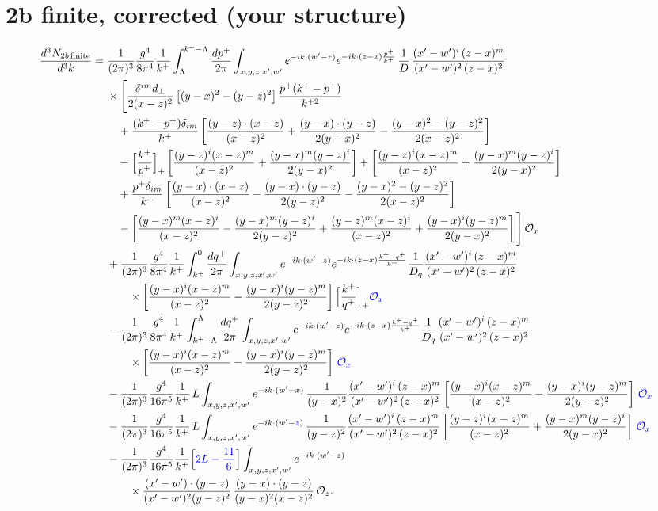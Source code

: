 \documentclass[10pt]{article}
\numberwithin{equation}{section}
\newcommand{\new}[1]{{\color{blue}#1}}
\newcommand{\pre}{\frac{1}{(2\pi)^{3}}\frac{g^{4}}{8\pi^{4}}\frac{1}{k^{+}}}
\newcommand{\preE}{\frac{1}{(2\pi)^{3}}\frac{g^{4}}{16\pi^{5}}\frac{1}{k^{+}}}
\newcommand{\Kxw}{\frac{(x'-w')^{i}\,(z-x)^{m}}{(x'-w')^{2}\,(z-x)^{2}}}
\newcommand{\BB}{\left[\frac{(y-x)^{i}(x-z)^{m}}{(x-z)^{2}}-\frac{(y-x)^{i}(y-z)^{m}}{2(y-z)^{2}}\right]}
\newcommand{\BF}{\left[\frac{(y-z)^{i}(x-z)^{m}}{(x-z)^{2}}+\frac{(y-x)^{m}(y-z)^{i}}{2(y-x)^{2}}\right]}
\newcommand{\Ox}{\mathcal O_x}
\newcommand{\Oz}{\mathcal O_z}
\begin{document}
\section{2b finite, corrected (your structure)}
\begin{align}
\frac{d^{3}N_{2b\,\rm finite}}{d^{3}k}={}&\pre\int_{\Lambda}^{k^{+}-\Lambda}\frac{dp^{+}}{2\pi}\int_{x,y,z,x',w'}e^{-ik\cdot(w'-z)}e^{-ik\cdot(z-x)\frac{p^{+}}{k^{+}}}\,\frac{1}{D}\,\Kxw\notag\\
&\times\Bigg[\frac{\delta^{im}d_{\perp}}{2(x-z)^{2}}\left[(y-x)^{2}-(y-z)^{2}\right]\frac{p^{+}(k^{+}-p^{+})}{k^{+2}}\notag\\
&\quad+\frac{(k^{+}-p^{+})\delta_{im}}{k^{+}}\left[\frac{(y-z)\cdot(x-z)}{(x-z)^{2}}+\frac{(y-x)\cdot(y-z)}{2(y-x)^{2}}-\frac{(y-x)^{2}-(y-z)^{2}}{2(x-z)^{2}}\right]\notag\\
&\quad-\Big[\frac{k^{+}}{p^{+}}\Big]_{+}\BF+\BF\notag\\
&\quad+\frac{p^{+}\delta_{im}}{k^{+}}\left[\frac{(y-x)\cdot(x-z)}{(x-z)^{2}}-\frac{(y-x)\cdot(y-z)}{2(y-z)^{2}}-\frac{(y-x)^{2}-(y-z)^{2}}{2(x-z)^{2}}\right]\notag\\
&\quad-\left[\frac{(y-x)^{m}(x-z)^{i}}{(x-z)^{2}}-\frac{(y-x)^{m}(y-z)^{i}}{2(y-z)^{2}}+\frac{(y-z)^{m}(x-z)^{i}}{(x-z)^{2}}+\frac{(y-x)^{i}(y-z)^{m}}{2(y-x)^{2}}\right]\Bigg]\,\Ox\notag\\
&+\pre\int_{k^{+}}^{0}\frac{dq^{+}}{2\pi}\int_{x,y,z,x',w'}e^{-ik\cdot(w'-z)}e^{-ik\cdot(z-x)\frac{k^{+}-q^{+}}{k^{+}}}\frac{1}{D_q}\Kxw\notag\\
&\qquad\times\BB\Big[\frac{k^{+}}{q^{+}}\Big]_{+}\new{\Ox}\notag\\
&-\pre\int_{k^{+}-\Lambda}^{\Lambda}\frac{dq^{+}}{2\pi}\int_{x,y,z,x',w'}e^{-ik\cdot(w'-z)}e^{-ik\cdot(z-x)\frac{k^{+}-q^{+}}{k^{+}}}\frac{1}{D_q}\Kxw\notag\\
&\qquad\times\BB\,\new{\Ox}\notag\\
&-\preE\,L\int_{x,y,z,x',w'}e^{-ik\cdot(w'-x)}\,\frac{1}{(y-x)^{2}}\Kxw\BB\,\new{\Ox}\notag\\
&-\preE\,L\int_{x,y,z,x',w'}e^{-ik\cdot(w'-\new{z})}\,\frac{1}{(y-z)^{2}}\Kxw\BF\,\new{\Ox}\notag\\
&-\preE\Big[\new{2L-\frac{11}{6}}\Big]\int_{x,y,z,x',w'}e^{-ik\cdot(w'-z)}\notag\\
&\qquad\times\frac{(x'-w')\cdot(y-z)}{(x'-w')^{2}(y-z)^{2}}\,\frac{(y-x)\cdot(y-z)}{(y-x)^{2}(x-z)^{2}}\,\Oz .
\label{eq:corr}
\end{align}
\end{document}
